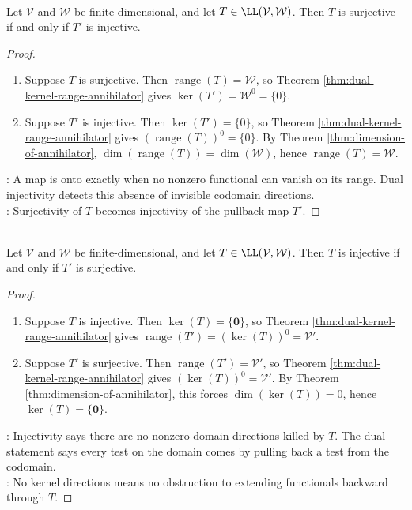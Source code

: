 \begin{corollary} \label{cor:surjective-iff-dual-injective} \\
Let $\mathcal{V}$ and $\mathcal{W}$ be finite-dimensional, and let $T\in\LL(\mathcal{V},\mathcal{W})$. Then $T$ is surjective if and only if $T'$ is injective.
\begin{proof}
\begin{enumerate}[label=\roman*.]
\setlength{\itemsep}{0pt}
\item[$(\Rightarrow)$] Suppose $T$ is surjective. Then $\operatorname{range}(T)=\mathcal{W}$, so Theorem \ref{thm:dual-kernel-range-annihilator} gives $\ker(T')=\mathcal{W}^0=\{0\}$.
\item[$(\Leftarrow)$] Suppose $T'$ is injective. Then $\ker(T')=\{0\}$, so Theorem \ref{thm:dual-kernel-range-annihilator} gives $(\operatorname{range}(T))^0=\{0\}$. By Theorem \ref{thm:dimension-of-annihilator}, $\dim(\operatorname{range}(T))=\dim(\mathcal{W})$, hence $\operatorname{range}(T)=\mathcal{W}$.
\end{enumerate}
: A map is onto exactly when no nonzero functional can vanish on its range. Dual injectivity detects this absence of invisible codomain directions.\\
: Surjectivity of $T$ becomes injectivity of the pullback map $T'$.
\end{proof}
\end{corollary}

\begin{corollary} \label{cor:injective-iff-dual-surjective} \\
Let $\mathcal{V}$ and $\mathcal{W}$ be finite-dimensional, and let $T\in\LL(\mathcal{V},\mathcal{W})$. Then $T$ is injective if and only if $T'$ is surjective.
\begin{proof}
\begin{enumerate}[label=\roman*.]
\setlength{\itemsep}{0pt}
\item[$(\Rightarrow)$] Suppose $T$ is injective. Then $\ker(T)=\{\mathbf{0}\}$, so Theorem \ref{thm:dual-kernel-range-annihilator} gives $\operatorname{range}(T')=(\ker(T))^0=\mathcal{V}'$.
\item[$(\Leftarrow)$] Suppose $T'$ is surjective. Then $\operatorname{range}(T')=\mathcal{V}'$, so Theorem \ref{thm:dual-kernel-range-annihilator} gives $(\ker(T))^0=\mathcal{V}'$. By Theorem \ref{thm:dimension-of-annihilator}, this forces $\dim(\ker(T))=0$, hence $\ker(T)=\{\mathbf{0}\}$.
\end{enumerate}
: Injectivity says there are no nonzero domain directions killed by $T$. The dual statement says every test on the domain comes by pulling back a test from the codomain.\\
: No kernel directions means no obstruction to extending functionals backward through $T$.
\end{proof}
\end{corollary}

